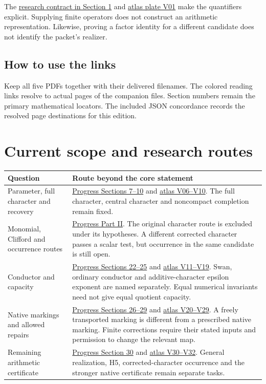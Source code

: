 The \href{https://komorebi.invalid/b07/contract}{research contract in Section 1} and \href{https://komorebi.invalid/b07/contract_atlas}{atlas plate V01} make the quantifiers explicit. Supplying finite operators does not construct an arithmetic representation. Likewise, proving a factor identity for a different candidate does not identify the packet's realizer.

\subsection*{How to use the links}
Keep all five PDFs together with their delivered filenames. The colored reading links resolve to actual pages of the companion files. Section numbers remain the primary mathematical locators. The included JSON concordance records the resolved page destinations for this edition.
\clearpage
\section*{Current scope and research routes}
{}
\begin{tabular}{@{}>{\raggedright\arraybackslash}p{.32\linewidth}>{\raggedright\arraybackslash}p{.63\linewidth}@{}}\toprule
Question & Route beyond the core statement\\\midrule
Parameter, full character and recovery & \href{https://komorebi.invalid/b07/arithmetic}{Progress Sections 7--10} and \href{https://komorebi.invalid/b07/arithmetic_atlas}{atlas V06--V10}. The full character, central character and noncompact completion remain fixed.\\[8pt]
Monomial, Clifford and occurrence routes & \href{https://komorebi.invalid/b07/monomial}{Progress Part II}. The original character route is excluded under its hypotheses. A different corrected character passes a scalar test, but occurrence in the same candidate is still open.\\[8pt]
Conductor and capacity & \href{https://komorebi.invalid/b07/conductor}{Progress Sections 22--25} and \href{https://komorebi.invalid/b07/conductor_atlas}{atlas V11--V19}. Swan, ordinary conductor and additive-character epsilon exponent are named separately. Equal numerical invariants need not give equal quotient capacity.\\[8pt]
Native markings and allowed repairs & \href{https://komorebi.invalid/b07/markings}{Progress Sections 26--29} and \href{https://komorebi.invalid/b07/markings_atlas}{atlas V20--V29}. A freely transported marking is different from a prescribed native marking. Finite corrections require their stated inputs and permission to change the relevant map.\\[8pt]
Remaining arithmetic certificate & \href{https://komorebi.invalid/b07/remaining}{Progress Section 30} and \href{https://komorebi.invalid/b07/remaining_atlas}{atlas V30--V32}. General realization, H5, corrected-character occurrence and the stronger native certificate remain separate tasks.\\\bottomrule
\end{tabular}

